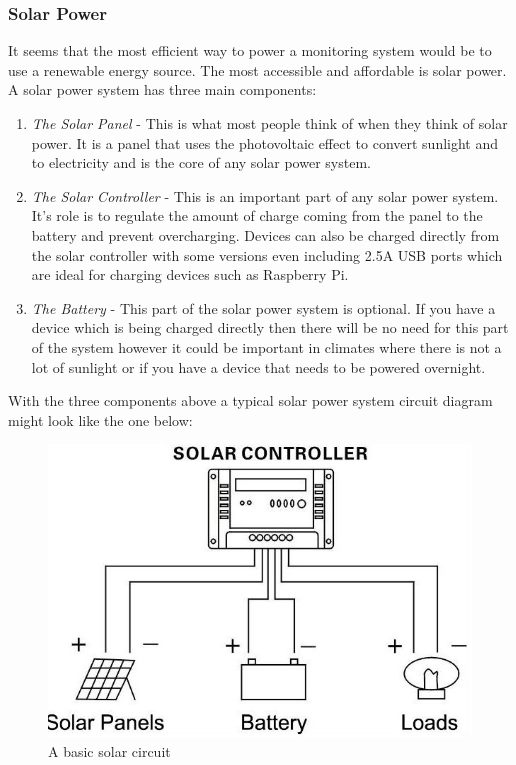 \documentclass[10pt,a4paper]{article}
\begin{document}
\subsubsection{Solar Power}
It seems that the most efficient way to power a monitoring system would be to use a renewable energy source. The most accessible and affordable is solar power. A solar power system has three main components: 
\begin{enumerate}
\item\textit{The Solar Panel} - This is what most people think of when they think of solar power. It is a panel that uses the photovoltaic effect to convert sunlight and to electricity and is the core of any solar power system.
\item\textit{The Solar Controller} - This is an important part of any solar power system. It's role is to regulate the amount of charge coming from the panel to the battery and prevent overcharging\citep{website:energymatters}. Devices can also be charged directly from the solar controller with some versions even including 2.5A USB ports which are ideal for charging devices such as Raspberry Pi.
\item\textit{The Battery} - This part of the solar power system is optional. If you have a device which is being charged directly then there will be no need for this part of the system however it could be important in climates where there is not a lot of sunlight or if you have a device that needs to be powered overnight.
\end{enumerate}

With the three components above a typical solar power system circuit diagram might look like the one below\citep{website:edgefx}: 

\begin{figure}[H]
\centering
  \includegraphics[width=\linewidth]{images/solarcircuit.jpg}
  \caption{A basic solar circuit}
  \label{fig:solarcircuit}
\end{figure}
\end{document}
